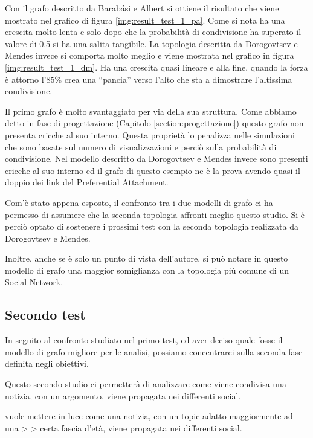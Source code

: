 Con il grafo descritto da Barabási e Albert si ottiene il risultato che viene mostrato nel grafico di figura \ref{img:result_test_1_pa}.
Come si nota ha una crescita molto lenta e solo dopo che la probabilità di condivisione ha superato il valore di 0.5 si ha una salita tangibile.
La topologia descritta da Dorogovtsev e Mendes invece si comporta molto meglio e viene mostrata nel grafico in figura \ref{img:result_test_1_dm}.
Ha una crescita quasi lineare e alla fine, quando la forza è attorno l'85\% crea una ``pancia'' verso l'alto che sta a dimostrare l'altissima 
condivisione.

Il primo grafo è molto svantaggiato per via della sua struttura. Come abbiamo detto in fase di progettazione (Capitolo \ref{section:progettazione}) 
questo grafo non presenta cricche al suo interno.
Questa proprietà lo penalizza nelle simulazioni che sono basate sul numero di visualizzazioni e perciò sulla probabilità di condivisione.
Nel modello descritto da Dorogovtsev e Mendes invece sono presenti cricche al suo interno ed il grafo di questo esempio ne è la prova
avendo quasi il doppio dei link del Preferential Attachment.

Com'è stato appena esposto, il confronto tra i due modelli di grafo ci ha permesso di assumere che la seconda topologia 
affronti meglio questo studio.
Si è perciò optato di sostenere i prossimi test con la seconda topologia realizzata da Dorogovtsev e Mendes.

Inoltre, anche se è solo un punto di vista dell'autore, si può notare in questo modello di grafo una 
maggior somiglianza con la topologia più comune di un Social Network.


\subsection{Secondo test}
\label{section:second_test}

In seguito al confronto studiato nel primo test, ed aver deciso quale fosse il modello di grafo migliore per le analisi, 
possiamo concentrarci sulla seconda fase definita negli obiettivi.

Questo secondo studio ci permetterà di analizzare come viene condivisa una notizia, con un argomento, viene propagata nei differenti social.

vuole mettere in luce come una notizia, con un topic adatto maggiormente ad una
> > certa fascia d'età, viene propagata nei differenti social.



